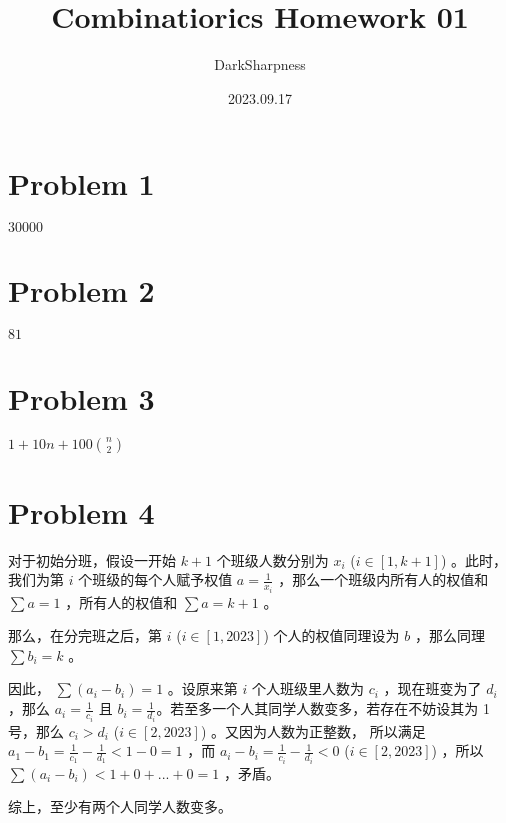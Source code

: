 \documentclass[fontset=windows]{article}
\title{\heiti\zihao{2} Combinatiorics Homework 01}
\author{DarkSharpness}
\date{2023.09.17}
\begin{document}
	\maketitle

\tableofcontents


\section*{Problem 1} $30000$

\section*{Problem 2} $81$

\section*{Problem 3} $ 1 + 10n + 100  {n \choose 2} $

\section*{Problem 4}

对于初始分班，假设一开始 $k + 1$ 个班级人数分别为 $x_i$ ($i \in [1,k + 1]$) 。此时，我们为第 $i$ 个班级的每个人赋予权值 $ a = \frac 1 {x_i} $ ，那么一个班级内所有人的权值和 $\sum a = 1$ ，所有人的权值和 $\sum a = k + 1$ 。

那么，在分完班之后，第 $i$ ($i \in [1,2023] $) 个人的权值同理设为 $b$ ，那么同理 $\sum b_i = k$ 。

因此， $\sum (a_i-b_i) = 1$ 。设原来第 $i$ 个人班级里人数为 $c_i$ ，现在班变为了 $d_i$ ，那么 $a_i = \frac 1 {c_i}$ 且 $b_i = \frac 1 {d_i}$。若至多一个人其同学人数变多，若存在不妨设其为 1 号，那么 $c_i > d_i$ ($i \in [2,2023]$) 。又因为人数为正整数， 所以满足 $a_1 - b_1 = \frac 1 {c_1} - \frac 1 {d_1}  < 1 - 0 = 1$ ，而 $a_i - b_i = \frac 1 {c_i} - \frac 1 {d_i} < 0  $ ($i \in [2,2023]$) ，所以 $\sum (a_i-b_i) < 1 + 0 + ... + 0 = 1$ ，矛盾。

综上，至少有两个人同学人数变多。
\end{document}
